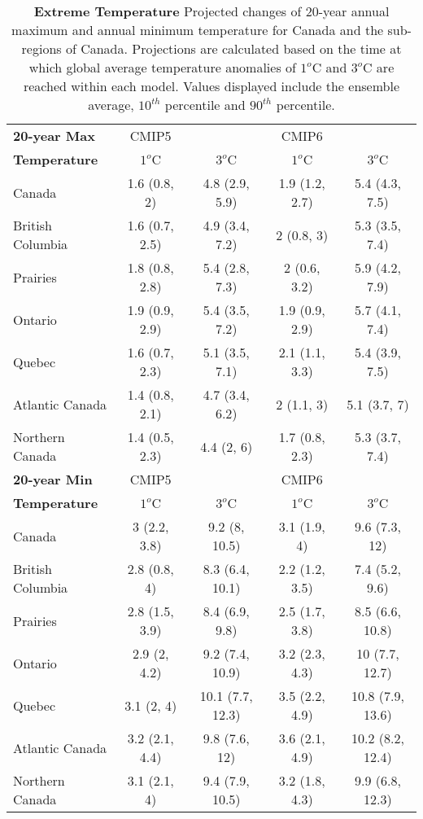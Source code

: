 \documentclass[]{scrartcl}
\begin{document}
\begin{table}[t]
	\caption{\textbf{Extreme Temperature} Projected changes of 20-year annual maximum and annual minimum temperature for Canada and the sub-regions of Canada. Projections are calculated based on the time at which global average temperature anomalies of $1^o$C and $3^o$C are reached within each model. Values displayed include the ensemble average, $10^{th}$ percentile and $90^{th}$ percentile.}\label{table:deg_ext_tas}
	\begin{center}
		\begin{tabularx}{\linewidth}{|L|cc|cc|} 
			\hline
			\textbf{20-year Max} & CMIP5 &  & CMIP6 &   \\
			\textbf{Temperature} & $1^o$C & $3^o$C & $1^o$C & $3^o$C \\
			\hline
			Canada & 1.6 (0.8, 2) & 4.8 (2.9, 5.9) & 1.9 (1.2, 2.7) & 5.4 (4.3, 7.5) \\ 
			British Columbia & 1.6 (0.7, 2.5) & 4.9 (3.4, 7.2) & 2 (0.8, 3) & 5.3 (3.5, 7.4) \\ 
			Prairies & 1.8 (0.8, 2.8) & 5.4 (2.8, 7.3) & 2 (0.6, 3.2) & 5.9 (4.2, 7.9) \\ 
			Ontario & 1.9 (0.9, 2.9) & 5.4 (3.5, 7.2) & 1.9 (0.9, 2.9) & 5.7 (4.1, 7.4) \\ 
			Quebec & 1.6 (0.7, 2.3) & 5.1 (3.5, 7.1) & 2.1 (1.1, 3.3) & 5.4 (3.9, 7.5) \\ 
			Atlantic Canada & 1.4 (0.8, 2.1) & 4.7 (3.4, 6.2) & 2 (1.1, 3) & 5.1 (3.7, 7) \\ 
			Northern Canada & 1.4 (0.5, 2.3) & 4.4 (2, 6) & 1.7 (0.8, 2.3) & 5.3 (3.7, 7.4) \\ 
			\hline
			\textbf{20-year Min} & CMIP5 &  & CMIP6 &   \\
			\textbf{Temperature} & $1^o$C & $3^o$C & $1^o$C & $3^o$C \\	
			\hline
			Canada & 3 (2.2, 3.8) & 9.2 (8, 10.5) & 3.1 (1.9, 4) & 9.6 (7.3, 12) \\ 
			British Columbia & 2.8 (0.8, 4) & 8.3 (6.4, 10.1) & 2.2 (1.2, 3.5) & 7.4 (5.2, 9.6) \\ 
			Prairies & 2.8 (1.5, 3.9) & 8.4 (6.9, 9.8) & 2.5 (1.7, 3.8) & 8.5 (6.6, 10.8) \\ 
			Ontario & 2.9 (2, 4.2) & 9.2 (7.4, 10.9) & 3.2 (2.3, 4.3) & 10 (7.7, 12.7) \\ 
			Quebec & 3.1 (2, 4) & 10.1 (7.7, 12.3) & 3.5 (2.2, 4.9) & 10.8 (7.9, 13.6) \\ 
			Atlantic Canada & 3.2 (2.1, 4.4) & 9.8 (7.6, 12) & 3.6 (2.1, 4.9) & 10.2 (8.2, 12.4) \\ 
			Northern Canada & 3.1 (2.1, 4) & 9.4 (7.9, 10.5) & 3.2 (1.8, 4.3) & 9.9 (6.8, 12.3) \\ 
			\hline	
		\end{tabularx}
	\end{center}
\end{table}
\end{document}
